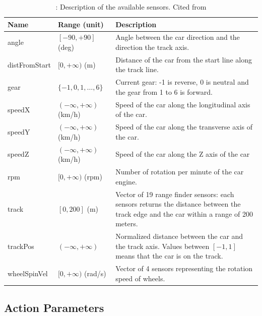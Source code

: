 \documentclass[declaration,shortabstract,english,inz]{iithesis}
\begin{document}
\begin{table}[h]
    \centering
    \begin{tabular}{ |p{2.5cm}|p{2.8cm}|p{8cm}|}
     \hline
     \textbf{Name} & \textbf{Range (unit)} & \textbf{Description} \\ 
     \hline
     angle & $[-90, +90]$ (deg) & Angle between the car direction and the direction the track axis. \\  
     \hline
     distFromStart & $[0, +\infty)$ (m) & Distance of the car from the start line along the track line. \\
     \hline
     gear & $ \{ -1,0,1, \dots, 6 \} $ & Current gear: -1 is reverse, 0 is neutral and the gear from 1 to 6 is forward. \\
     \hline
     speedX & $ ( -\infty, +\infty ) $ (km/h) & Speed of the car along the longitudinal axis of the car. \\
     \hline
     speedY & $ ( -\infty, +\infty ) $ (km/h) & Speed of the car along the transverse axis of the car. \\
     \hline
     speedZ & $ ( -\infty, +\infty ) $ (km/h) & Speed of the car along the Z axis of the car \\
     \hline
     rpm & $ [0, +\infty ) $ (rpm) & Number of rotation per minute of the car engine. \\
     \hline        
     track &  $[0, 200]$ (m) & Vector of 19 range finder sensors: each sensors returns the distance between the track edge and the car within a range of 200 meters. \\
     \hline
     trackPos & $( -\infty, +\infty )$ & Normalized distance between the car and the track axis. Values between $[-1, 1]$ means that the car is on the track. \\
     \hline
     wheelSpinVel & $[0, +\infty)$ (rad/s) & Vector of 4 sensors representing the rotation speed of wheels. \\
     \hline
    \end{tabular}
     \caption{\label{tab:torcs_sensors}: Description of the available sensors. Cited from \cite{scrc_manual}}
\end{table}

\subsection{Action Parameters}
\end{document}
